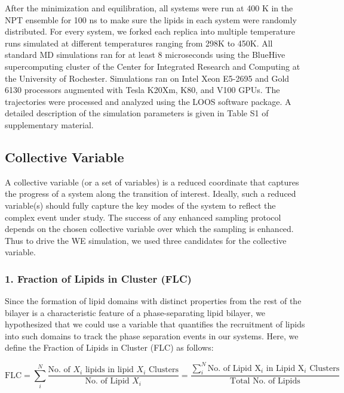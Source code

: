 \documentclass{biophys-new}
\begin{document}
After the minimization and equilibration, all systems were run at 400 K in the NPT ensemble for 100 ns to make sure the lipids in each system were randomly distributed.
For every system, we forked each replica into multiple temperature runs simulated at different temperatures ranging from 298K to 450K.
All standard MD simulations ran for at least 8 microseconds using the BlueHive supercomputing cluster of the Center for Integrated Research and Computing at the University of Rochester.
Simulations ran on Intel Xeon E5-2695 and Gold 6130 processors augmented with Tesla K20Xm, K80, and V100 GPUs.   
The trajectories were processed and analyzed using the LOOS software package.
A detailed description of the simulation parameters is given in Table S1 of supplementary material. 

\subsection*{Collective Variable}

A collective variable (or a set of variables) is a reduced coordinate that captures the progress of a system along the transition of interest.
Ideally, such a reduced variable(s) should fully capture the key modes of the system to reflect the complex event under study.
The success of any enhanced sampling protocol depends on the chosen collective variable over which the sampling is enhanced\cite{Valsson2016, Yang2019b, Henin2022}. 
Thus to drive the WE simulation, we used three candidates for the collective variable.

\subsubsection*{1. Fraction of Lipids in Cluster (FLC)}
Since the formation of lipid domains with distinct properties from the rest of the bilayer is a characteristic feature of a phase-separating lipid bilayer,
we hypothesized that we could use a variable that quantifies the recruitment of lipids into such domains to track the phase separation events in our systems.
Here, we define the Fraction of Lipids in Cluster (FLC) as follows:

\begin{equation}
\label{eq:CLT}
\text{FLC} = \sum_{i}^{N} \frac{\text{No. of $X_i$ lipids in lipid $X_i$ Clusters}}{\text{No. of Lipid $X_i$}} =  \frac{\sum_{i}^{N} \text{No. of Lipid X$_i$ in Lipid X$_i$ Clusters}}{\text{Total No. of Lipids}}
\end{equation}
\end{document}
